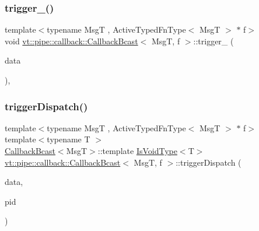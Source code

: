 \subsubsection{\texorpdfstring{trigger\+\_\+()}{trigger\_()}\hspace{0.1cm}{\footnotesize\ttfamily [3/3]}}
{\footnotesize\ttfamily template$<$typename MsgT , Active\+Typed\+Fn\+Type$<$ Msg\+T $>$ $\ast$ f$>$ \\
void \hyperlink{structvt_1_1pipe_1_1callback_1_1_callback_bcast}{vt\+::pipe\+::callback\+::\+Callback\+Bcast}$<$ MsgT, f $>$\+::trigger\+\_\+ (\begin{DoxyParamCaption}\item[{\hyperlink{structvt_1_1pipe_1_1callback_1_1_callback_bcast_aaf994b71056001334d30d74fa9c958f9}{Signal\+Data\+Type} $\ast$}]{data }\end{DoxyParamCaption})\hspace{0.3cm}{\ttfamily [override]}, {\ttfamily [private]}}

\mbox{\label{structvt_1_1pipe_1_1callback_1_1_callback_bcast_aa5c6f297ec676eb2dda4d4b6238fa282}} 
\subsubsection{\texorpdfstring{trigger\+Dispatch()}{triggerDispatch()}\hspace{0.1cm}{\footnotesize\ttfamily [1/4]}}
{\footnotesize\ttfamily template$<$typename MsgT , Active\+Typed\+Fn\+Type$<$ Msg\+T $>$ $\ast$ f$>$ \\
template$<$typename T $>$ \\
\hyperlink{structvt_1_1pipe_1_1callback_1_1_callback_bcast}{Callback\+Bcast}$<$MsgT$>$\+::template \hyperlink{structvt_1_1pipe_1_1callback_1_1_callback_bcast_a3ca08c23824cfac76b837311a1d2c929}{Is\+Void\+Type}$<$T$>$ \hyperlink{structvt_1_1pipe_1_1callback_1_1_callback_bcast}{vt\+::pipe\+::callback\+::\+Callback\+Bcast}$<$ MsgT, f $>$\+::trigger\+Dispatch (\begin{DoxyParamCaption}\item[{\hyperlink{structvt_1_1pipe_1_1callback_1_1_callback_bcast_aaf994b71056001334d30d74fa9c958f9}{Signal\+Data\+Type} $\ast$}]{data,  }\item[{\hyperlink{namespacevt_ac9852acda74d1896f48f406cd72c7bd3}{Pipe\+Type} const \&}]{pid }\end{DoxyParamCaption})}

